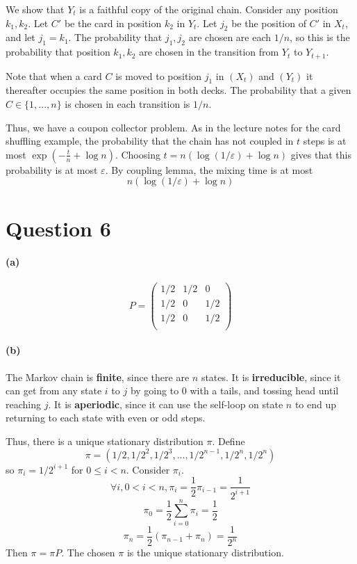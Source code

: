 \documentclass[11pt]{article} %
\begin{document}
We show that $Y_t$ is a faithful copy of the original chain.
Consider any position $k_1,k_2$. Let $C'$ be the card in position $k_2$ in $Y_t$.
Let $j_2$ be the position of $C'$ in $X_t$, and let $j_1=k_1$.
The probability that $j_1,j_2$ are chosen are each $1/n$, 
so this is the probability that position $k_1,k_2$ are chosen in the transition from $Y_t$ to $Y_{t+1}$.

Note that when a card $C$ is moved to position $j_1$ in $(X_t)$ and $(Y_t)$
it thereafter occupies the same position in both decks.
The probability that a given $C\in\{1,...,n\}$ is chosen in each transition is $1/n$.

Thus, we have a coupon collector problem. 
As in the lecture notes for the card shuffling example,
the probability that the chain has not coupled in $t$ steps is at most $\exp (-\frac{t}{n}+\log n)$.
Choosing $t=n(\log(1/\varepsilon)+\log n)$ gives that this probability is at most $\varepsilon$.
By coupling lemma, the mixing time is at most
\[n(\log(1/\varepsilon)+\log n)\]

\section*{Question 6}

\paragraph{(a)}
\[P=
\begin{pmatrix}
1/2 & 1/2 & 0\\
1/2 & 0 & 1/2\\
1/2 & 0 & 1/2\\
\end{pmatrix}\]

\paragraph{(b)}
The Markov chain is \textbf{finite}, since there are $n$ states.
It is \textbf{irreducible}, since it can get from any state $i$ to $j$ by going to $0$ with a tails,
and tossing head until reaching $j$.
It is \textbf{aperiodic}, since it can use the self-loop on state $n$ 
to end up returning to each state with even or odd steps.

Thus, there is a unique stationary distribution $\pi$. Define
\[\pi=(1/2,1/2^2,1/2^3,...,1/2^{n-1},1/2^n,1/2^n)\]
so $\pi_i=1/2^{i+1}$ for $0\leq i<n$.
Consider $\pi_i$.
\[\forall i, 0 < i < n, \pi_i = \frac{1}{2}\pi_{i-1} = \frac{1}{2^{i+1}}\]
\[\pi_0 = \frac{1}{2}\sum_{i=0}^n \pi_i = \frac{1}{2}\]
\[\pi_n = \frac{1}{2}(\pi_{n-1}+\pi_n) = \frac{1}{2^n}\]
Then $\pi=\pi P$. The chosen $\pi$ is the unique stationary distribution.
\end{document}
